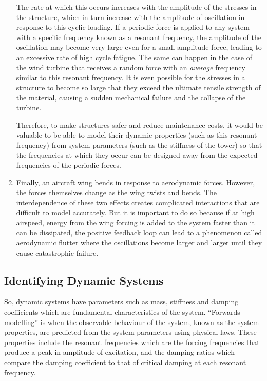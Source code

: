 \documentclass[12pt]{article}
\begin{document}
\begin{enumerate}[listparindent=\parindent]
        The rate at which this occurs increases with the amplitude of the stresses in the structure, which in turn increase with the amplitude of oscillation in response to this cyclic loading.
        If a periodic force is applied to any system with a specific frequency known as a resonant frequency, the amplitude of the oscillation may become very large even for a small amplitude force, leading to an excessive rate of high cycle fatigue.
        The same can happen in the case of the wind turbine that receives a random force with an \textit{average} frequency similar to this resonant frequency.
        It is even possible for the stresses in a structure to become so large that they exceed the ultimate tensile strength of the material, causing a sudden mechanical failure and the collapse of the turbine.

        Therefore, to make structures safer and reduce maintenance costs, it would be valuable to be able to model their dynamic properties (such as this resonant frequency) from system parameters (such as the stiffness of the tower) so that the frequencies at which they occur can be designed away from the expected frequencies of the periodic forces.

        \item Finally, an aircraft wing bends in response to aerodynamic forces.
        However, the forces themselves change as the wing twists and bends.
        The interdependence of these two effects creates complicated interactions that are difficult to model accurately.
        But it is important to do so because if at high airspeed, energy from the wing forcing is added to the system faster than it can be dissipated, the positive feedback loop can lead to a phenomenon called aerodynamic flutter where the oscillations become larger and larger until they cause catastrophic failure.
    \end{enumerate}

    \subsection{Identifying Dynamic Systems}

    So, dynamic systems have parameters such as mass, stiffness and damping coefficients which are fundamental characteristics of the system.
    ``Forwards modelling'' is when the observable behaviour of the system, known as the system properties, are predicted from the system parameters using physical laws.
    These properties include the resonant frequencies which are the forcing frequencies that produce a peak in amplitude of excitation, and the damping ratios which compare the damping coefficient to that of critical damping at each resonant frequency.
\end{document}
